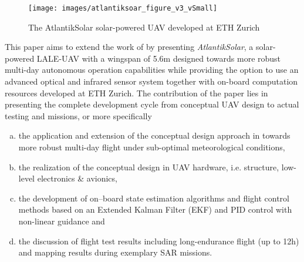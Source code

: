 \begin{figure}[b]
    \centering
    \texttt{[image: images/atlantiksoar\_figure\_v3\_vSmall]}
    \caption{The AtlantikSolar solar-powered UAV developed at ETH Zurich}
    \label{fig:AtlantikSolarCollage}
\end{figure}


This paper aims to extend the work of \cite{Cocconi_SoLong,Noth_PhD} by presenting \textit{AtlantikSolar}, a solar-powered LALE-UAV with a wingspan of 5.6m designed towards more robust multi-day autonomous operation capabilities while providing the option to use an advanced optical and infrared sensor system together with on-board computation resources developed at ETH Zurich. The contribution of the paper lies in presenting the complete development cycle from conceptual UAV design to actual testing and missions, or more specifically
  
 \begin{enumerate}[(a)]
\item the application and extension of the conceptual design approach in \cite{Noth_PhD,Leutenegger_JIRS} towards more robust multi-day flight under sub-optimal meteorological conditions, 
\item the realization of the conceptual design in UAV hardware, i.e. structure, low-level electronics \& avionics, 
\item the development of on--board state estimation algorithms and flight control methods based on an Extended Kalman Filter (EKF) and PID control with non-linear guidance and
\item the discussion of flight test results including long-endurance flight (up to 12h) and mapping results during exemplary SAR missions.
\end{enumerate}

